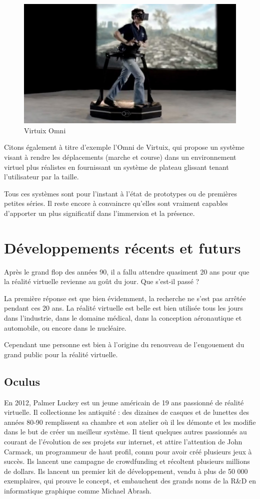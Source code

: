 \documentclass[a4,12pt]{scrartcl}
\begin{document}
\begin{figure}[H]
	\centering
	\includegraphics[width=0.6\linewidth]{omni}
	\caption{Virtuix Omni}
	\label{omni}
\end{figure}

Citons également à titre d'exemple l'Omni de Virtuix, qui propose un système visant à rendre les déplacements (marche et course) dans un environnement virtuel plus réalistes en fournissant un système de plateau glissant tenant l'utilisateur par la taille.

Tous ces systèmes sont pour l'instant à l'état de prototypes ou de premières petites séries. Il reste encore à convaincre qu'elles sont vraiment capables d'apporter un plus significatif dans l'immersion et la présence.

\section{Développements récents et futurs}

Après le grand flop des années 90, il a fallu attendre quasiment 20 ans pour que la réalité virtuelle revienne au goût du jour. Que s'est-il passé ?

La première réponse est que bien évidemment, la recherche ne s'est pas arrêtée pendant ces 20 ans. La réalité virtuelle est belle est bien utilisée tous les jours dans l'industrie, dans le domaine médical, dans la conception aéronautique et automobile, ou encore dans le nucléaire.

Cependant une personne est bien à l'origine du renouveau de l'engouement du grand public pour la réalité virtuelle.

\subsection{Oculus}

En 2012, Palmer Luckey est un jeune américain de 19 ans passionné de réalité virtuelle. Il collectionne les antiquité : des dizaines de casques et de lunettes des années 80-90 remplissent sa chambre et son atelier où il les démonte et les modifie dans le but de créer un meilleur système. Il tient quelques autres passionnés au courant de l'évolution de ses projets sur internet, et attire l'attention de John Carmack, un programmeur de haut profil, connu pour avoir créé plusieurs jeux à succès. Ils lancent une campagne de crowdfunding et récoltent plusieurs millions de dollars. Ils lancent un premier kit de développement, vendu à plus de 50 000 exemplaires, qui prouve le concept, et embauchent des grands noms de la R\&D en informatique graphique comme Michael Abrash.
\end{document}
